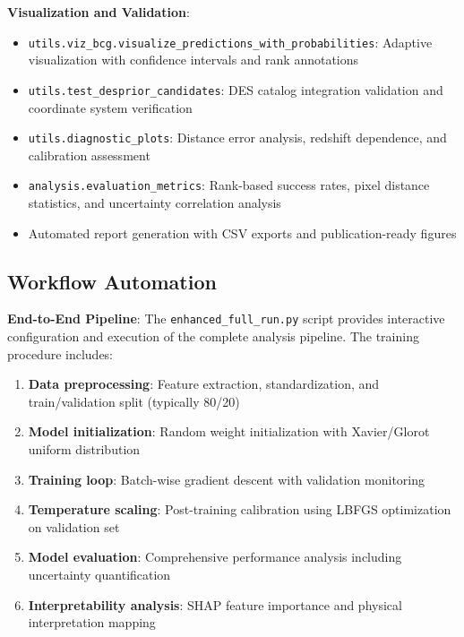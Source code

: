 \documentclass[twocolumn,10pt]{aastex631}
\begin{document}
\textbf{Visualization and Validation}:
\begin{itemize}
\item \texttt{utils.viz\_bcg.visualize\_predictions\_with\_probabilities}: Adaptive visualization with confidence intervals and rank annotations
\item \texttt{utils.test\_desprior\_candidates}: DES catalog integration validation and coordinate system verification
\item \texttt{utils.diagnostic\_plots}: Distance error analysis, redshift dependence, and calibration assessment
\item \texttt{analysis.evaluation\_metrics}: Rank-based success rates, pixel distance statistics, and uncertainty correlation analysis
\item Automated report generation with CSV exports and publication-ready figures
\end{itemize}

\subsection{Workflow Automation}

\textbf{End-to-End Pipeline}: The \texttt{enhanced\_full\_run.py} script provides interactive configuration and execution of the complete analysis pipeline. The training procedure includes:
\begin{enumerate}
\item \textbf{Data preprocessing}: Feature extraction, standardization, and train/validation split (typically 80/20)
\item \textbf{Model initialization}: Random weight initialization with Xavier/Glorot uniform distribution
\item \textbf{Training loop}: Batch-wise gradient descent with validation monitoring
\item \textbf{Temperature scaling}: Post-training calibration using LBFGS optimization on validation set
\item \textbf{Model evaluation}: Comprehensive performance analysis including uncertainty quantification
\item \textbf{Interpretability analysis}: SHAP feature importance and physical interpretation mapping
\end{enumerate}
\end{document}
